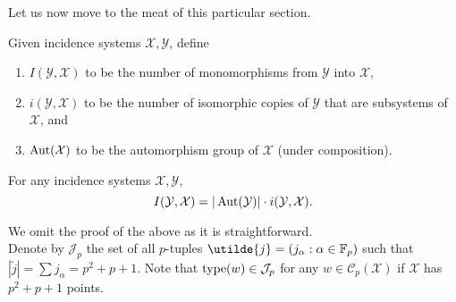 	Let us now move to the meat of this particular section.

	\begin{definition}
		Given incidence systems $\mathcal{X},\mathcal{Y}$, define
		\begin{enumerate}
			\item $I(\mathcal{Y},\mathcal{X})$ to be the number of monomorphisms from $\mathcal{Y}$ into $\mathcal{X}$,
			\item $i(\mathcal{Y},\mathcal{X})$ to be the number of isomorphic copies of $\mathcal{Y}$ that are subsystems of $\mathcal{X}$, and
			\item $\operatorname{Aut}(\mathcal{X})$ to be the automorphism group of $\mathcal{X}$ (under composition).
		\end{enumerate}
	\end{definition}

	\begin{lemma}
		\label{lemma: I i relation}
		For any incidence systems $\mathcal{X},\mathcal{Y}$,
		\[ I(\mathcal{Y},\mathcal{X}) = |\operatorname{Aut}(\mathcal{Y})| \cdot i(\mathcal{Y},\mathcal{X}). \]
	\end{lemma}
	We omit the proof of the above as it is straightforward.\\

	Denote by $\mathcal{J}_p$ the set of all $p$-tuples $\utilde{j} = (j_\alpha : \alpha \in \F_p)$ such that $|\utilde{j}| = \sum j_\alpha = p^2 + p + 1$. Note that $\operatorname{type}(w) \in \mathcal{J}_p$ for any $w \in \mathcal{C}_p(\mathcal{X})$ if $\mathcal{X}$ has $p^2+p+1$ points.

